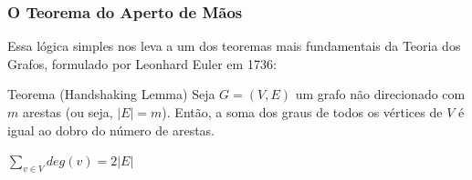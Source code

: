 \documentclass[9pt]{beamer}
\begin{document}
\begin{frame}
    \frametitle{O Teorema do Aperto de Mãos}
    Essa lógica simples nos leva a um dos teoremas mais fundamentais da Teoria dos Grafos, formulado por Leonhard Euler em 1736:
    \vspace{0.5cm}
    \begin{block}{Teorema (Handshaking Lemma)}
        Seja $G = (V, E)$ um grafo não direcionado com $m$ arestas (ou seja, $|E| = m$). Então, a soma dos graus de todos os vértices de $V$ é igual ao dobro do número de arestas.
        \vspace{0.3cm}
        \begin{center}
            \Large $\sum_{v \in V} deg(v) = 2|E|$
        \end{center}
    \end{block}
\end{frame}
\end{document}
